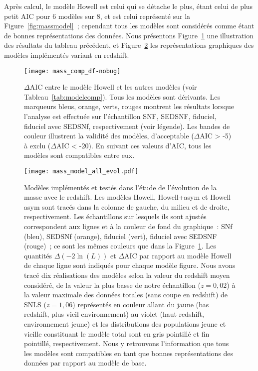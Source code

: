 \documentclass[../main/main.tex]{subfiles}
\begin{document}
Après calcul, le modèle Howell est celui qui se détache le plus, étant celui de
plus petit AIC pour 6 modèles sur 8, et est celui représenté sur la
Figure~\ref{fig:massmodel}~; cependant tous les modèles sont considérés comme
étant de bonnes représentations des données. Nous présentons
Figure~\ref{fig:mod_comp} une illustration des résultats du tableau précédent,
et Figure~\ref{fig:mod_all} les représentations graphiques des modèles
implémentés variant en redshift.

\begin{figure}[ht]
    \centering
    \texttt{[image: mass\_comp\_df-nobug]}
    \caption[$\Delta$AIC entre le modèle Howell et les autres
    modèles]{$\Delta$AIC entre le modèle Howell et les autres modèles (voir
        Tableau~\ref{tab:modelcomp}). Tous les modèles sont dérivants. Les
        marqueurs bleus, orange, verts, rouges montrent les résultats lorsque
        l'analyse est effectuée sur l'échantillon SNF, SEDSNF, fiduciel,
        fiduciel avec SEDSNf, respectivement (voir légende). Les bandes de
        couleur illustrent la validité des modèles, d'acceptable ($\Delta$AIC >
        -5) à exclu ($\Delta$AIC < -20). En suivant ces valeurs d'AIC, tous les
        modèles sont compatibles entre eux.}
    \label{fig:mod_comp}
\end{figure}

\begin{figure}[htbp]
    \vspace*{-3cm}
    \centerfloat
    \texttt{[image: mass\_model\_all\_evol.pdf]}
    \caption[Modèles implémentés et testés dans l'étude de l'évolution de
    l'étirement avec le redshift]{\scriptsize Modèles implémentés et testés dans
        l'étude de l'évolution de la masse avec le redshift. Les modèles Howell,
        Howell+asym et Howell asym sont tracés dans la colonne de gauche, du
        milieu et de droite, respectivement. Les échantillons sur lesquels ils
        sont ajustés correspondent aux lignes et à la couleur de fond du
        graphique~: SNf (bleu), SEDSNf (orange), fiduciel (vert), fiduciel avec
        SEDSNF (rouge)~; ce sont les mêmes couleurs que dans la
        Figure~\ref{fig:mod_comp}. Les quantités $\Delta(-2\ln(L))$ et
        $\Delta$AIC par rapport au modèle Howell de chaque ligne sont indiqués
        pour chaque modèle figure. Nous avons tracé dix réalisations des modèles
        selon la valeur du redshift moyen considéré, de la valeur la plus basse
        de notre échantillon ($z = 0,02$) à la valeur maximale des données
        totales (sans coupe en redshift) de SNLS ($z = 1,06$) représentés en
        couleur allant du jaune (bas redshift, plus vieil environnement) au
        violet (haut redshift, environnement jeune) et les distributions des
        populations jeune et vieille constituant le modèle total sont en gris
        pointillé et fin pointillé, respectivement. Nous y retrouvons
        l'information que tous les modèles sont compatibles en tant que bonnes
    représentations des données par rapport au modèle de base.}
    \label{fig:mod_all}
\end{figure}
\end{document}
